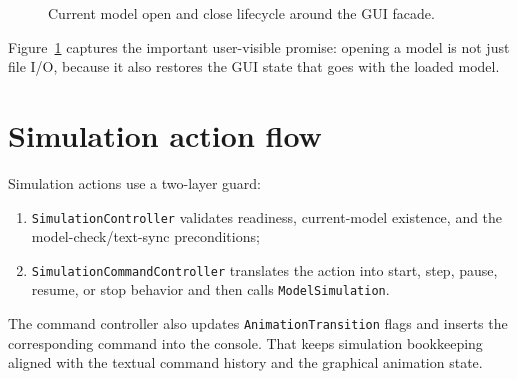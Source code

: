 \begin{figure}[htbp]
\centering
\caption{Current model open and close lifecycle around the GUI facade.}
\label{fig:gui-architecture-model-open}
\end{figure}

Figure~\ref{fig:gui-architecture-model-open} captures the important user-visible promise: opening a model is not just file I/O, because it also restores the GUI state that goes with the loaded model.

\section{Simulation action flow}
\label{sec:gui-architecture-simulation-flow}

Simulation actions use a two-layer guard:
\begin{enumerate}
\item \texttt{SimulationController} validates readiness, current-model existence, and the model-check/text-sync preconditions;
\item \texttt{SimulationCommandController} translates the action into start, step, pause, resume, or stop behavior and then calls \texttt{ModelSimulation}.
\end{enumerate}

The command controller also updates \texttt{AnimationTransition} flags and inserts the corresponding command into the console. That keeps simulation bookkeeping aligned with the textual command history and the graphical animation state.

